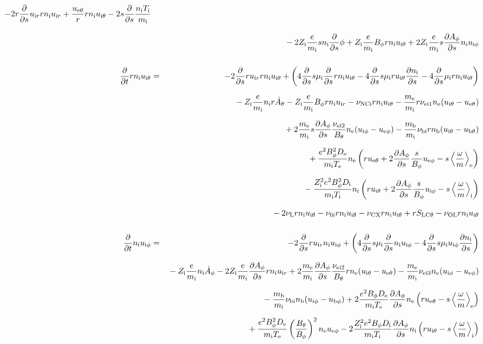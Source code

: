\documentclass[11pt]{article}
\def\r#1{{\rm#1}}
\def\ddt{\frac{\partial}{\partial t}}
\def\dds{\frac{\partial}{\partial s}}
\def\dd#1{\frac{\partial #1}{\partial s}}
\def\ave#1{\left\langle#1\right\rangle}
\def\me{m_\r{e}}
\def\mi{m_\r{i}}
\def\mb{m_\r{b}}
\def\mui{\mu_\r{i}}
\def\De{D_\r{e}}
\def\Di{D_\r{i}}
\def\ne{n_\r{e}}
\def\ni{n_\r{i}}
\def\nb{n_\r{b}}
\def\uir{u_{\r{i}r}}
\def\ueth{u_{\r{e}\theta}}
\def\uith{u_{\r{i}\theta}}
\def\ubth{u_{\r{b}\theta}}
\def\ueph{u_{\r{e}\phi}}
\def\uiph{u_{\r{i}\phi}}
\def\ubph{u_{\r{b}\phi}}
\def\Bth{B_\theta}
\def\Bph{B_\phi}
\def\Athd{\dot{A}_\theta}
\def\Aphd{\dot{A}_\phi}
\def\Aph{A_\phi}
\def\Te{T_\r{e}}
\def\Ti{T_\r{i}}
\def\Zi{Z_\r{i}}
\def\nuNCi{\nu_\r{NCi}}
\def\nubi{\nu_\r{bi}}
\def\nuni{\nu_\r{0i}}
\def\nuL{\nu_\r{L}}
\def\nuCX{\nu_\r{CX}}
\def\nuOL{\nu_\r{OL}}
\begin{document}
\begin{eqnarray}
%
  - 2 r \dds \uir r \ni \uir
%
  + \frac{\ueth}{r} r \ni \uith
%
  - 2 s \dds \frac{\ni \Ti}{\mi}
\nonumber\\[3mm]&&{}
%
  - 2 \Zi \frac{e}{\mi} s \ni \dds \phi
%
  + \Zi \frac{e}{\mi} \Bph r \ni \uith
%
  + 2 \Zi \frac{e}{\mi} s \dd{\Aph} \ni \uiph
\\[5mm]
%
%
  \ddt r \ni \uith &=&
%
  - 2 \dds r \uir r \ni \uith
%
  + \left(   4 \dds s \mui \dds r \ni \uith
%
           - 4 \dds s \mui r \uith \dd{\ni}
%
	   - 4 \dds \mui r \ni \uith \right)
\nonumber\\[2.5mm]&&{}
%
  - \Zi \frac{e}{\mi} \ni r \Athd
%
  - \Zi \frac{e}{\mi} \Bph r \ni \uir
%
  - \nuNCi r \ni \uith
%
  - \frac{\me}{\mi} r \nu_\r{ei1} \ne (\uith - \ueth)
\nonumber\\[2.5mm]&&{}
%
  + 2 \frac{\me}{\mi} s \dd{\Aph} \frac{\nu_\r{ei2}}{\Bth} \ne (\uiph - \ueph)
%
  - \frac{\mb}{\mi} \nubi r \nb (\uith - \ubth)
\nonumber\\[2.5mm]&&{}
%
  + \frac{e^2 \Bph^2 \De}{\mi\Te}\ne
    \left(r \ueth + 2\dd{\Aph}\frac{s}{\Bph}\ueph - s
     \ave{\frac{\omega}{m}}_\r{e} \right)
\nonumber\\[2.5mm]&&{}
%
  - \frac{\Zi^2 e^2 \Bph^2 \Di}{\mi\Ti}\ni
    \left(r \uith + 2\dd{\Aph}\frac{s}{\Bph}\uiph - s
     \ave{\frac{\omega}{m}}_\r{i} \right)
\nonumber\\[2.5mm]&&{}
%
  - 2 \nuL r \ni \uith
%
  - \nuni r \ni \uith
%
  - \nuCX r \ni \uith
%
  + r S_\r{LC\theta}
%
  - \nuOL r \ni \uith
%
%
\\[5mm]
%
%
  \ddt \ni \uiph &=&
%
  - 2 \dds r \uir \ni \uiph
%
  + \left(   4 \dds s \mui \dds \ni \uiph
%
           - 4 \dds s \mui \uiph \dd{\ni} \right)
\nonumber\\[2.5mm]&&{}
%
  - \Zi \frac{e}{\mi} \ni \Aphd
%
  - 2 \Zi \frac{e}{\mi} \dd{\Aph} r \ni \uir 
%
  + 2 \frac{\me}{\mi} \dd{\Aph} \frac{\nu_\r{ei2}}{\Bth} r \ne (\uith - \ueth)
%
  - \frac{\me}{\mi} \nu_\r{ei3} \ne (\uiph - \ueph)
\nonumber\\[2.5mm]&&{}
%
  - \frac{\mb}{\mi} \nubi \nb (\uiph - \ubph)
%
  + 2\frac{e^2 \Bph \De}{\mi\Te}\dd{\Aph}\ne
    \left(r \ueth - s \ave{\frac{\omega}{m}}_\r{e} \right)
\nonumber\\[2.5mm]&&{}
%
  + \frac{e^2 \Bph^2 \De}{\mi\Te}\left(\frac{\Bth}{\Bph}\right)^2\ne\ueph
%
  - 2\frac{\Zi^2 e^2 \Bph \Di}{\mi\Ti}\dd{\Aph}\ni
    \left(r \uith - s \ave{\frac{\omega}{m}}_\r{i} \right)

\end{eqnarray}
\end{document}
